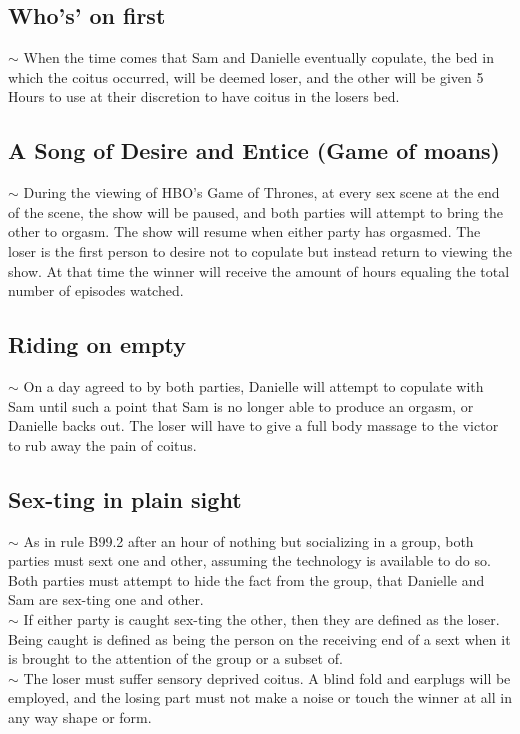  

\subsection{Who's' on first} 

   \indent $\sim$ When the time comes that Sam and Danielle eventually copulate, the bed in which the coitus occurred, 
   will be deemed loser, and the other will be given 5 Hours to use at their discretion to have coitus in the losers bed.

 

 \subsection{A Song of Desire and Entice (Game of moans)}

   \indent $\sim$ During the viewing of HBO's Game of Thrones, at every sex scene at the end of the scene,
    the show will be paused, and both parties will attempt to bring the other to orgasm.  
    The show will resume when either party has orgasmed. The loser is the first person to desire not to copulate
     but instead return to viewing the show. At that time the winner will receive the amount of hours equaling the total 
     number of episodes watched.

 

 \subsection{Riding on empty} 

   \indent $\sim$ On a day agreed to by both parties, Danielle will attempt to copulate with Sam until  
     such a point that Sam is no longer able to produce an orgasm, or Danielle backs out.  
     The loser will have to give a full body massage to the victor to rub away the pain of 
     coitus. 

 

 \subsection{Sex-ting in plain sight}  

  \indent $\sim$ As in rule B99.2 after an hour of nothing but socializing in a group, both parties must  
     sext one and other, assuming the technology is available to do so. Both parties must attempt to hide the fact from the group, 
     that Danielle and Sam are sex-ting one and other. \\
     \indent $\sim$ \hspace{5mm} If either party is caught sex-ting the other, then they are defined as the loser.
       Being caught is defined as being the person on the receiving end of a sext when it is  
       brought to the attention of the group or a subset of.\\ 
     \indent $\sim$ \hspace{5mm} The loser must suffer sensory deprived coitus. A blind fold and earplugs will be 
       employed, and the losing part must not make a noise or touch the winner at all in any way shape or form. 

